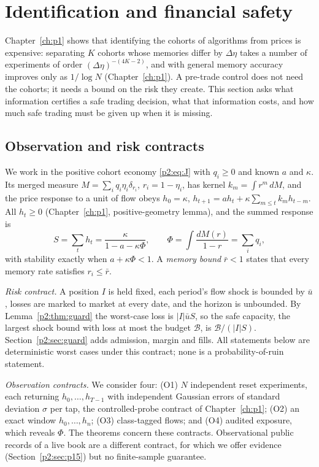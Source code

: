 \section{Identification and financial safety}\label{p2:sec:infosafety}

Chapter~\ref{ch:p1} shows that identifying the cohorts of algorithms from prices is expensive: separating $K$ cohorts whose memories differ by $\Delta\eta$ takes a number of experiments of order $(\Delta\eta)^{-(4K-2)}$, and with general memory accuracy improves only as $1/\log N$ (Chapter~\ref{ch:p1}). A pre-trade control does not need the cohorts; it needs a bound on the risk they create. This section asks what information certifies a safe trading decision, what that information costs, and how much safe trading must be given up when it is missing.

\subsection{Observation and risk contracts}\label{p2:sec:contracts}
We work in the positive cohort economy \eqref{p2:eq:J} with $q_i\ge0$ and known $a$ and $\kappa$. Its merged measure $M=\sum_iq_i\eta_i\delta_{r_i}$, $r_i=1-\eta_i$, has kernel $k_m=\int r^m\,dM$, and the price response to a unit of flow obeys $h_0=\kappa$, $h_{t+1}=ah_t+\kappa\sum_{m\le t}k_mh_{t-m}$. All $h_t\ge0$ (Chapter~\ref{ch:p1}, positive-geometry lemma), and the summed response is
\begin{equation}\label{p2:eq:SPhi}
S=\sum_th_t=\frac{\kappa}{1-a-\kappa\Phi},\qquad \Phi=\int\frac{dM(r)}{1-r}=\sum_iq_i ,
\end{equation}
with stability exactly when $a+\kappa\Phi<1$. A \emph{memory bound} $\bar r<1$ states that every memory rate satisfies $r_i\le\bar r$.

\emph{Risk contract.} A position $I$ is held fixed, each period's flow shock is bounded by $\bar u$, losses are marked to market at every date, and the horizon is unbounded. By Lemma~\ref{p2:thm:guard} the worst-case loss is $|I|\bar uS$, so the safe capacity, the largest shock bound with loss at most the budget $\mathcal B$, is $\mathcal B/(|I|S)$. Section~\ref{p2:sec:guard} adds admission, margin and fills. All statements below are deterministic worst cases under this contract; none is a probability-of-ruin statement.

\emph{Observation contracts.} We consider four: (O1) $N$ independent reset experiments, each returning $h_0,\ldots,h_{T-1}$ with independent Gaussian errors of standard deviation $\sigma$ per tap, the controlled-probe contract of Chapter~\ref{ch:p1}; (O2) an exact window $h_0,\ldots,h_n$; (O3) class-tagged flows; and (O4) audited exposure, which reveals $\Phi$. The theorems concern these contracts. Observational public records of a live book are a different contract, for which we offer evidence (Section~\ref{p2:sec:p15}) but no finite-sample guarantee.

